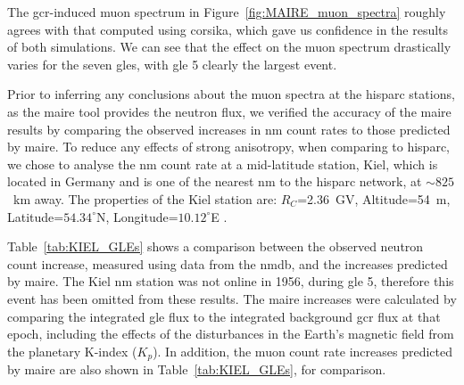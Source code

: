 The \gls{gcr}-induced muon spectrum in Figure~\ref{fig:MAIRE_muon_spectra} roughly agrees with that computed using \gls{corsika}, which gave us confidence in the results of both simulations. We can see that the effect on the muon spectrum drastically varies for the seven \glspl{gle}, with \gls{gle} 5 clearly the largest event.

Prior to inferring any conclusions about the muon spectra at the \gls{hisparc} stations, as the \gls{maire} tool provides the neutron flux, we verified the accuracy of the \gls{maire} results by comparing the observed increases in \gls{nm} count rates to those predicted by \gls{maire}. To reduce any effects of strong anisotropy, when comparing to \gls{hisparc}, we chose to analyse the \gls{nm} count rate at a mid-latitude station, Kiel, which is located in Germany and is one of the nearest \gls{nm} to the \gls{hisparc} network, at $\sim 825$~km away. The properties of the Kiel station are: $R_C$=2.36~GV, Altitude=54~m, Latitude=$54.34^{\circ}$N, Longitude=$10.12^{\circ}$E \citep{nmdb_nmdb_nodate}.

Table~\ref{tab:KIEL_GLEs} shows a comparison between the observed neutron count increase, measured using data from the \gls{nmdb}, and the increases predicted by \gls{maire}. The Kiel \gls{nm} station was not online in 1956, during \gls{gle} 5, therefore this event has been omitted from these results. The \gls{maire} increases were calculated by comparing the integrated \gls{gle} flux to the integrated background \gls{gcr} flux at that epoch, including the effects of the disturbances in the Earth's magnetic field from the planetary K-index ($K_p$). In addition, the muon count rate increases predicted by \gls{maire} are also shown in Table~\ref{tab:KIEL_GLEs}, for comparison.

